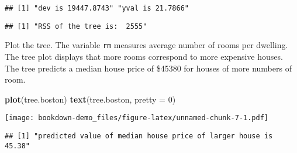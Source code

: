 \documentclass[]{book}
\newenvironment{Shaded}{\begin{snugshade}}{\end{snugshade}}
\newcommand{\DataTypeTok}[1]{\textcolor[rgb]{0.13,0.29,0.53}{#1}}
\newcommand{\DecValTok}[1]{\textcolor[rgb]{0.00,0.00,0.81}{#1}}
\newcommand{\FloatTok}[1]{\textcolor[rgb]{0.00,0.00,0.81}{#1}}
\newcommand{\KeywordTok}[1]{\textcolor[rgb]{0.13,0.29,0.53}{\textbf{#1}}}
\newcommand{\NormalTok}[1]{#1}
\newcommand{\OperatorTok}[1]{\textcolor[rgb]{0.81,0.36,0.00}{\textbf{#1}}}
\newcommand{\StringTok}[1]{\textcolor[rgb]{0.31,0.60,0.02}{#1}}
\begin{document}
\begin{verbatim}
## [1] "dev is 19447.8743" "yval is 21.7866"
\end{verbatim}

\begin{Shaded}
\end{Shaded}

\begin{verbatim}
## [1] "RSS of the tree is:  2555"
\end{verbatim}

Plot the tree. The variable \texttt{rm} measures average number of rooms per dwelling. The tree plot displays that more rooms correspond to more expensive houses. The tree predicts a median house price of \$45380 for houses of more numbers of room.

\begin{Shaded}
\begin{Highlighting}[]
\KeywordTok{plot}\NormalTok{(tree.boston)}
\KeywordTok{text}\NormalTok{(tree.boston, }\DataTypeTok{pretty =} \DecValTok{0}\NormalTok{)}
\end{Highlighting}
\end{Shaded}

\texttt{[image: bookdown-demo\_files/figure-latex/unnamed-chunk-7-1.pdf]}

\begin{Shaded}
\end{Shaded}

\begin{verbatim}
## [1] "predicted value of median house price of larger house is  45.38"
\end{verbatim}
\end{document}
